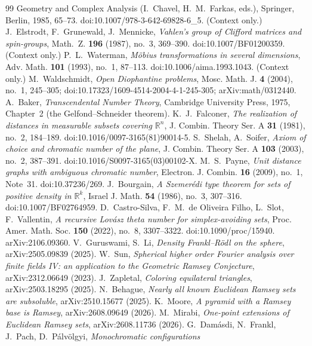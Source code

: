 \documentclass[11pt]{amsart}
\newcommand{\R}{\mathbb{R}}
\theoremstyle{plain}
\theoremstyle{definition}
\begin{document}
\begin{thebibliography}{99}
{Geometry and Complex Analysis} (I.~Chavel, H.~M.~Farkas, eds.), Springer, Berlin, 1985, 65--73.
doi:10.1007/978-3-642-69828-6\_5. (Context only.)
 J.~Elstrodt, F.~Grunewald, J.~Mennicke, \emph{Vahlen's group of Clifford matrices and
spin-groups}, Math.~Z. \textbf{196} (1987), no.~3, 369--390. doi:10.1007/BF01200359. (Context only.)
 P.~L.~Waterman, \emph{M\"obius transformations in several dimensions}, Adv. Math.
\textbf{101} (1993), no.~1, 87--113. doi:10.1006/aima.1993.1043. (Context only.)
 M.~Waldschmidt, \emph{Open Diophantine problems}, Mosc. Math. J. \textbf{4}
(2004), no.~1, 245--305; doi:10.17323/1609-4514-2004-4-1-245-305; arXiv:math/0312440.
 A.~Baker, \emph{Transcendental Number Theory}, Cambridge University Press, 1975,
Chapter~2 (the Gelfond--Schneider theorem).
 K.~J.~Falconer, \emph{The realization of distances in measurable subsets covering $\R^n$},
J. Combin. Theory Ser. A \textbf{31} (1981), no.~2, 184--189. doi:10.1016/0097-3165(81)90014-5.
 S.~Shelah, A.~Soifer, \emph{Axiom of choice and chromatic number of the plane}, J. Combin.
Theory Ser. A \textbf{103} (2003), no.~2, 387--391. doi:10.1016/S0097-3165(03)00102-X.
 M.~S.~Payne, \emph{Unit distance graphs with ambiguous chromatic number}, Electron. J. Combin.
\textbf{16} (2009), no.~1, Note~31. doi:10.37236/269.
 J.~Bourgain, \emph{A Szemer\'edi type theorem for sets of positive density in $\R^k$}, Israel
J. Math. \textbf{54} (1986), no.~3, 307--316. doi:10.1007/BF02764959.
 D.~Castro-Silva, F.~M.~de Oliveira Filho, L.~Slot, F.~Vallentin, \emph{A recursive Lov\'asz
theta number for simplex-avoiding sets}, Proc. Amer. Math. Soc. \textbf{150} (2022), no.~8,
3307--3322. doi:10.1090/proc/15940. arXiv:2106.09360.
 V.~Guruswami, S.~Li, \emph{Density Frankl--R\"odl on the sphere}, arXiv:2505.09839 (2025).
 W.~Sun, \emph{Spherical higher order Fourier analysis over finite fields IV: an application to the
Geometric Ramsey Conjecture}, arXiv:2312.06649 (2023).
 J.~Zapletal, \emph{Coloring equilateral triangles}, arXiv:2503.18295 (2025).
 N.~Behague, \emph{Nearly all known Euclidean Ramsey sets are subsoluble},
arXiv:2510.15677 (2025).
 K.~Moore, \emph{A pyramid with a Ramsey base is Ramsey}, arXiv:2608.09649 (2026).
 M.~Mirabi, \emph{One-point extensions of Euclidean Ramsey sets}, arXiv:2608.11736 (2026).
 G.~Dam\'asdi, N.~Frankl, J.~Pach, D.~P\'alv\"olgyi, \emph{Monochromatic configurations
}
\end{thebibliography}
\end{document}
